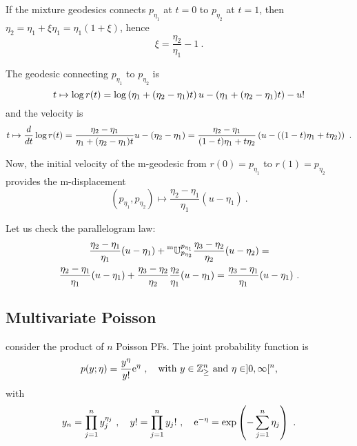 \documentclass[12pt,a4paper]{amsart}
\theoremstyle{remark}
\begin{document}
If the mixture geodesics connects $p_{\eta_1}$ at $t = 0$ to $p_{\eta_2}$ at $t = 1$, then $\eta_2 = \eta_1 + \xi \eta_1 = \eta_1 (1 + \xi)$, hence
\begin{equation}
    \xi = \frac {\eta_2}{\eta_1} - 1 \ .
\end{equation}

The geodesic connecting $p_{\eta_1}$ to $p_{\eta_2}$ is
\begin{equation}
  \label{eq:24}
t \mapsto \log r(t) = \log\left(\eta_1 + (\eta_2- \eta_1)t\right) u - \left(\eta_1 + (\eta_2-\eta_1) t \right) - u!
\end{equation}
and the velocity is
\begin{equation}
  \label{eq:25}
t \mapsto \frac{d}{dt} \log r(t) = \frac {\eta_2 - \eta_1}{\eta_1 + (\eta_2 - \eta_1)t} u - (\eta_2 - \eta_1) =
\frac {\eta_2 - \eta_1}{(1-t) \eta_1 + t \eta_2} \left(u - ((1-t) \eta_1 + t \eta_2) \right) \ .
\end{equation}

Now, the initial velocity of the m-geodesic from $r(0) = p_{\eta_1}$ to $r(1) = p_{\eta_2}$ provides the m-displacement
\begin{equation}
    (p_{\eta_1}, p_{\eta_2}) \mapsto \frac {\eta_2 - \eta_1}{\eta_1} (u - \eta_1) \ .
    \end{equation}

Let us check the parallelogram law:
\begin{multline}
\frac {\eta_2 - \eta_1}{\eta_1} (u - \eta_1) + \prescript{\text{m}}{} {\mathbb U} _ {p_{\eta_2}} ^ {p_{\eta_1}} \frac {\eta_3 - \eta_2}{\eta_2} (u - \eta_2) = \\
\frac {\eta_2 - \eta_1}{\eta_1} (u - \eta_1) + \frac {\eta_3 - \eta_2}{\eta_2} \frac {\eta_2}{\eta_1} (u - \eta_1) =
\frac {\eta_3 - \eta_1}{\eta_1} (u - \eta_1) \ .\end{multline}
\subsection{Multivariate Poisson}
\label{sec:multivariate-poisson}

consider the product of $n$ Poisson PFs. The joint probability function is
\begin{equation}
    p(y;\eta) = \frac {y^\eta}{y!} \mathrm{e}^{\eta} \ , \quad \text{with $y \in \mathbb{Z}_\ge^n$ and $\eta \in ]0,\infty[^n$,}
\end{equation}
with\begin{equation}
    y_n = \prod_{j=1}^n y_j^{\eta_j}\ , \quad y! = \prod_{j=1}^n y_j! \ ,\quad \mathrm{e}^{-\eta} = \exp\left(- \sum_{j=1}^n \eta_j\right) \ .
\end{equation}
\end{document}
